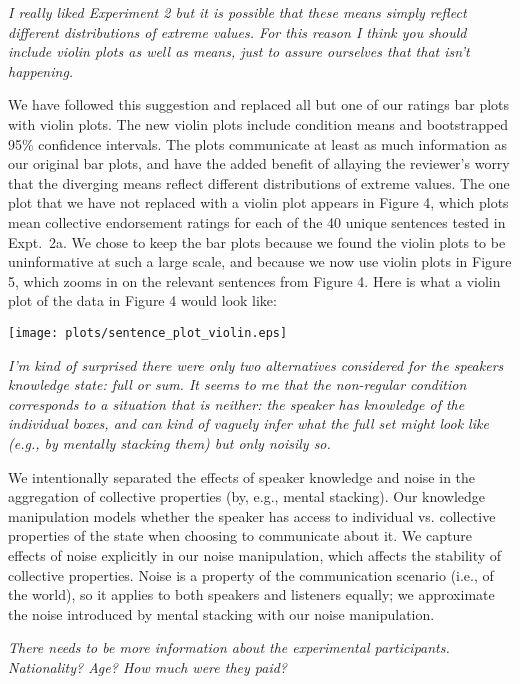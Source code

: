 \documentclass[12pt]{article}
\begin{document}
\item \emph{I really liked Experiment 2 but it is possible that these means simply reflect different distributions of extreme values. For this reason I think you should include violin plots as well as means, just to assure ourselves that that isn't happening.}

We have followed this suggestion and replaced all but one of our ratings bar plots with violin plots. The new violin plots include condition means and bootstrapped 95\% confidence intervals. The plots communicate at least as much information as our original bar plots, and have the added benefit of allaying the reviewer's worry that the diverging means reflect different distributions of extreme values. The one plot that we have not replaced with a violin plot appears in Figure 4, which plots mean collective endorsement ratings for each of the 40 unique sentences tested in Expt.~2a. We chose to keep the bar plots because we found the violin plots to be uninformative at such a large scale, and because we now use violin plots in Figure 5, which zooms in on the relevant sentences from Figure 4. Here is what a violin plot of the data in Figure 4 would look like:

\texttt{[image: plots/sentence\_plot\_violin.eps]}

\item \emph{I'm kind of surprised there were only two alternatives considered for the speakers knowledge state: full or sum. It seems to me that the non-regular condition corresponds to a situation that is neither: the speaker has knowledge of the individual boxes, and can kind of vaguely infer what the full set might look like (e.g., by mentally stacking them) but only noisily so.}

We intentionally separated the effects of speaker knowledge and noise in the aggregation of collective properties (by, e.g., mental stacking). Our knowledge manipulation models whether the speaker has access to individual vs. collective properties of the state when choosing to communicate about it. We capture effects of noise explicitly in our noise manipulation, which affects the stability of collective properties. Noise is a property of the communication scenario (i.e., of the world), so it applies to both speakers and listeners equally; we approximate the noise introduced by mental stacking with our noise manipulation.

\item \emph{There needs to be more information about the experimental participants. Nationality? Age? How much were they paid?}
\end{document}
